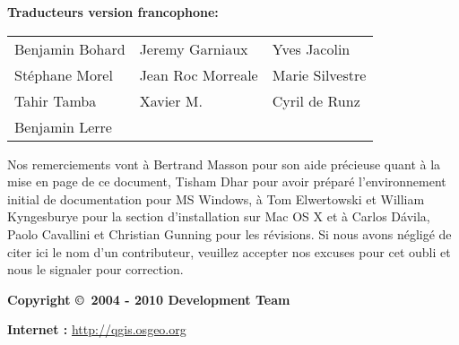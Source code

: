 \begin{flushleft}
\textbf{Traducteurs version francophone:}
  \par\bigskip\noindent
\begin{tabular}{p{4cm} p{4cm} p{4cm}}
Benjamin Bohard & Jeremy Garniaux & Yves Jacolin \\
Stéphane Morel & Jean Roc Morreale & Marie Silvestre \\
Tahir Tamba & Xavier M. & Cyril de Runz \\
Benjamin Lerre \\
\end{tabular}
\end{flushleft}

Nos remerciements vont à Bertrand Masson pour son aide précieuse quant à la mise en page de ce document, Tisham Dhar pour avoir préparé l'environnement initial de documentation pour MS Windows, à Tom Elwertowski et William Kyngesburye pour la section d'installation sur Mac OS X et à Carlos  D\'{a}vila, Paolo Cavallini et Christian Gunning pour les révisions. Si nous avons négligé de citer ici le nom d'un contributeur, veuillez accepter nos excuses pour cet oubli et nous le signaler pour correction.
 \par\bigskip\noindent
\textbf{Copyright \copyright~2004 - 2010 \QG Development Team}
\par\bigskip\noindent
\textbf{Internet :} \url{http://qgis.osgeo.org}
